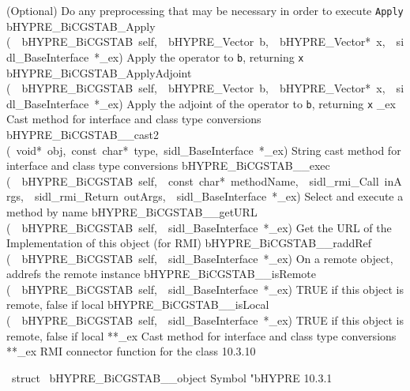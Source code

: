 \documentclass{article}
\begin{document}
\begin{cxxentry}
\begin{cxxentry}
\begin{cxxnames}
        {
(Optional) Do any preprocessing that may be necessary in
order to execute {\tt Apply}}
        {}
\label{cxx.10.3.29}
        {bHYPRE\_BiCGSTAB\_Apply}
        {(\ \ bHYPRE\_BiCGSTAB\ self,\ \ bHYPRE\_Vector\ b,\ \ bHYPRE\_Vector*\ x,\ \ sidl\_BaseInterface\ *\_ex)}
        {
Apply the operator to {\tt b}, returning {\tt x}}
        {}
\label{cxx.10.3.30}
        {bHYPRE\_BiCGSTAB\_ApplyAdjoint}
        {(\ \ bHYPRE\_BiCGSTAB\ self,\ \ bHYPRE\_Vector\ b,\ \ bHYPRE\_Vector*\ x,\ \ sidl\_BaseInterface\ *\_ex)}
        {
Apply the adjoint of the operator to {\tt b}, returning {\tt x}}
        {}
\label{cxx.10.3.31}
        {\_ex}
        {}
        {
Cast method for interface and class type conversions}
        {}
\label{cxx.10.3.32}
        {bHYPRE\_BiCGSTAB\_\_cast2}
        {(\ void*\ obj,\ const\ char*\ type,\ sidl\_BaseInterface\ *\_ex)}
        {
String cast method for interface and class type conversions}
        {}
\label{cxx.10.3.33}
        {bHYPRE\_BiCGSTAB\_\_exec}
        {(\ \ bHYPRE\_BiCGSTAB\ self,\ \ const\ char*\ methodName,\ \ sidl\_rmi\_Call\ inArgs,\ \ sidl\_rmi\_Return\ outArgs,\ \ sidl\_BaseInterface\ *\_ex)}
        {
Select and execute a method by name}
        {}
\label{cxx.10.3.34}
        {bHYPRE\_BiCGSTAB\_\_getURL}
        {(\ \ bHYPRE\_BiCGSTAB\ self,\ \ sidl\_BaseInterface\ *\_ex)}
        {
Get the URL of the Implementation of this object (for RMI)}
        {}
\label{cxx.10.3.35}
        {bHYPRE\_BiCGSTAB\_\_raddRef}
        {(\ \ bHYPRE\_BiCGSTAB\ self,\ \ sidl\_BaseInterface\ *\_ex)}
        {
On a remote object, addrefs the remote instance}
        {}
\label{cxx.10.3.36}
        {bHYPRE\_BiCGSTAB\_\_isRemote}
        {(\ \ bHYPRE\_BiCGSTAB\ self,\ \ sidl\_BaseInterface\ *\_ex)}
        {
TRUE if this object is remote, false if local}
        {}
\label{cxx.10.3.37}
        {bHYPRE\_BiCGSTAB\_\_isLocal}
        {(\ \ bHYPRE\_BiCGSTAB\ self,\ \ sidl\_BaseInterface\ *\_ex)}
        {
TRUE if this object is remote, false if local}
        {}
\label{cxx.10.3.38}
        {**\_ex}
        {}
        {
Cast method for interface and class type conversions}
        {}
\label{cxx.10.3.39}
        {**\_ex}
        {}
        {
RMI connector function for the class}
        {10.3.10}
\end{cxxnames}
\begin{cxxvariable}
{\ struct\ }
        {bHYPRE\_BiCGSTAB\_\_object}
        {}
        {
Symbol "bHYPRE}
        {10.3.1}
\begin{cxxdoc}


\end{cxxdoc}
\end{cxxvariable}
\end{cxxentry}
\end{cxxentry}
\end{document}
